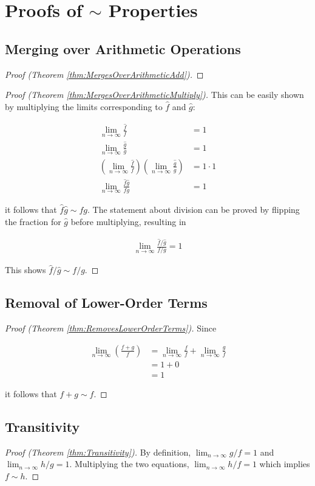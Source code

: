 \appendix
\appendixpage

\section{Proofs of $\sim$ Properties}

\subsection{Merging over Arithmetic Operations}
\label{pf:MergesOverArithmetic}

\begin{proof}[Proof (Theorem \ref{thm:MergesOverArithmeticAdd})]
\end{proof}

\begin{proof}[Proof (Theorem \ref{thm:MergesOverArithmeticMultiply})]
	This can be easily shown by multiplying the limits corresponding to $\hat{f}$ and $\hat{g}$:
	
	\begin{align*}
	\lim_{n \to \infty} \frac{\hat{f}}{f} &= 1\\
	\lim_{n \to \infty} \frac{\hat{g}}{g} &= 1\\
	\left( \lim_{n \to \infty} \frac{\hat{f}}{f} \right) \left( \lim_{n \to \infty} \frac{\hat{g}}{g} \right) &= 1 \cdot 1\\
	\lim_{n \to \infty} \frac{\hat{f}\hat{g}}{fg} &= 1
	\end{align*}
	
	it follows that $\hat{f}\hat{g} \sim fg$. The statement about division can be proved by flipping the fraction for $\hat{g}$ before multiplying, resulting in
	
	\begin{align*}
	\lim_{n \to \infty} \frac{\hat{f} / \hat{g}}{f / g} = 1
	\end{align*}
	
	This shows $\hat{f} / \hat{g} \sim f / g$.
\end{proof}

\subsection{Removal of Lower-Order Terms}
\label{pf:RemovesLowerOrderTerms}

\begin{proof}[Proof (Theorem \ref{thm:RemovesLowerOrderTerms})]
	Since
	
	\begin{align*}
	\lim_{n \to \infty} \left( \frac{f + g}{f} \right) &= \lim_{n \to \infty} \frac{f}{f} + \lim_{n \to \infty} \frac{g}{f}\\
	&= 1 + 0\\
	&= 1
	\end{align*}
	
	it follows that $f + g \sim f$.
\end{proof}

\subsection{Transitivity}
\label{pf:Transitivity}

\begin{proof}[Proof (Theorem \ref{thm:Transitivity})]
By definition, $\lim_{n \to \infty} g / f = 1$ and $\lim_{n \to \infty} h / g = 1$. Multiplying the two equations, $\lim_{n \to \infty} h / f = 1$ which implies $f \sim h$.
\end{proof}